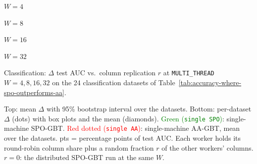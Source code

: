 \documentclass[sigconf,screen]{acmart}
\begin{document}
{\par\medskip
\noindent\begin{minipage}{\textwidth}
\captionsetup{type=figure}
\centering\edef{}%
\begin{minipage}[t]{0.245\textwidth}\centering\footnotesize $W=4$\\\resizebox{\linewidth}{!}{\begin{minipage}{\colrepw}\end{minipage}}\end{minipage}\hfill
\begin{minipage}[t]{0.245\textwidth}\centering\footnotesize $W=8$\\\resizebox{\linewidth}{!}{\begin{minipage}{\colrepw}\end{minipage}}\end{minipage}\hfill
\begin{minipage}[t]{0.245\textwidth}\centering\footnotesize $W=16$\\\resizebox{\linewidth}{!}{\begin{minipage}{\colrepw}\end{minipage}}\end{minipage}\hfill
\begin{minipage}[t]{0.245\textwidth}\centering\footnotesize $W=32$\\\resizebox{\linewidth}{!}{\begin{minipage}{\colrepw}\end{minipage}}\end{minipage}
\caption{Classification: $\Delta$ test AUC vs.\ column replication $r$ at \texttt{MULTI\_THREAD} $W=4, 8, 16, 32$ on the 24 classification datasets of Table~\ref{tab:accuracy-where-spo-outperforms-aa}.}
\label{fig:column-replication-where-spo-outperforms-aa}
\par\smallskip\raggedright\footnotesize Top: mean $\Delta$ with 95\% bootstrap interval over the datasets. Bottom: per-dataset $\Delta$ (dots) with box plots and the mean (diamonds). \textcolor{green}{Green (\texttt{single SPO})}: single-machine SPO-GBT. \textcolor{red}{Red dotted (\texttt{single AA})}: single-machine AA-GBT, mean over the datasets. pts = percentage points of test AUC. Each worker holds its round-robin column share plus a random fraction $r$ of the other workers' columns. $r=0$: the distributed SPO-GBT run at the same $W$.


\end{minipage}}
\end{document}
